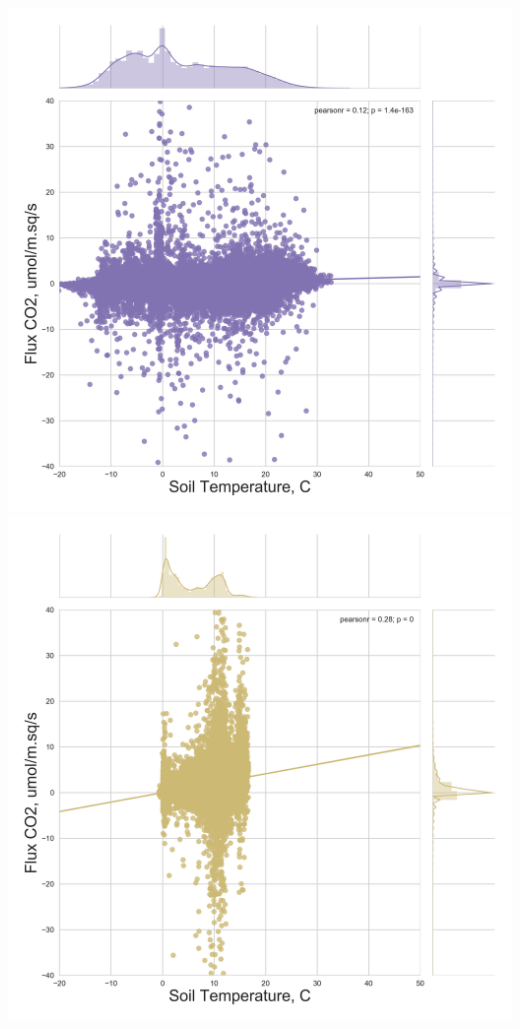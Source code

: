 \documentclass{beamer}
\begin{document}
\begin{frame}
\begin{columns}[t]
\centering
\includegraphics[width=\textwidth]{FvsT_night/US-FPe.png}\\
\includegraphics[width=\textwidth]{FvsT_night/US-Los.png}
\end{columns}

\end{frame}
\end{document}
